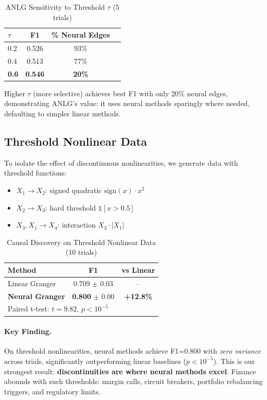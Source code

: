\documentclass[sigconf,nonacm]{acmart}
\begin{document}
\begin{table}[h]
\centering
\caption{ANLG Sensitivity to Threshold $\tau$ (5 trials)}
\begin{tabular}{lccc}
\toprule
$\tau$ & F1 & \% Neural Edges \\
\midrule
0.2 & 0.526 & 93\% \\
0.4 & 0.513 & 77\% \\
\textbf{0.6} & \textbf{0.546} & \textbf{20\%} \\
\bottomrule
\end{tabular}
\label{tab:ablation}
\end{table}

Higher $\tau$ (more selective) achieves best F1 with only 20\% neural edges, demonstrating ANLG's value: it uses neural methods sparingly where needed, defaulting to simpler linear methods.

\subsection{Threshold Nonlinear Data}
To isolate the effect of discontinuous nonlinearities, we generate data with threshold functions:
\begin{itemize}
    \item $X_1 \to X_2$: signed quadratic $\text{sign}(x) \cdot x^2$
    \item $X_2 \to X_3$: hard threshold $\mathbb{1}[x > 0.5]$
    \item $X_3, X_1 \to X_4$: interaction $X_3 \cdot |X_1|$
\end{itemize}

\begin{table}[h]
\centering
\caption{Causal Discovery on Threshold Nonlinear Data (10 trials)}
\begin{tabular}{lcc}
\toprule
\textbf{Method} & \textbf{F1} & \textbf{vs Linear} \\
\midrule
Linear Granger & 0.709 $\pm$ 0.03 & -- \\
\textbf{Neural Granger} & \textbf{0.800} $\pm$ 0.00 & \textbf{+12.8\%} \\
\bottomrule
\multicolumn{3}{l}{\small Paired t-test: $t=9.82$, $p < 10^{-5}$}
\end{tabular}
\label{tab:threshold}
\end{table}

\paragraph{Key Finding.} On threshold nonlinearities, neural methods achieve F1=0.800 with \textit{zero variance} across trials, significantly outperforming linear baselines ($p < 10^{-5}$). This is our strongest result: \textbf{discontinuities are where neural methods excel}. Finance abounds with such thresholds: margin calls, circuit breakers, portfolio rebalancing triggers, and regulatory limits.
\end{document}

